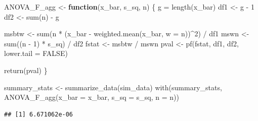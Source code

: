 \documentclass[
]{book}
\newenvironment{Shaded}{\begin{snugshade}}{\end{snugshade}}
\newcommand{\AttributeTok}[1]{\textcolor[rgb]{0.77,0.63,0.00}{#1}}
\newcommand{\ConstantTok}[1]{\textcolor[rgb]{0.00,0.00,0.00}{#1}}
\newcommand{\ControlFlowTok}[1]{\textcolor[rgb]{0.13,0.29,0.53}{\textbf{#1}}}
\newcommand{\DecValTok}[1]{\textcolor[rgb]{0.00,0.00,0.81}{#1}}
\newcommand{\FunctionTok}[1]{\textcolor[rgb]{0.00,0.00,0.00}{#1}}
\newcommand{\NormalTok}[1]{#1}
\newcommand{\OtherTok}[1]{\textcolor[rgb]{0.56,0.35,0.01}{#1}}
\newcommand{\SpecialCharTok}[1]{\textcolor[rgb]{0.00,0.00,0.00}{#1}}
\begin{document}
\begin{Shaded}
\begin{Highlighting}[]
\NormalTok{ANOVA\_F\_agg }\OtherTok{\textless{}{-}} \ControlFlowTok{function}\NormalTok{(x\_bar, s\_sq, n) \{}
\NormalTok{  g }\OtherTok{=} \FunctionTok{length}\NormalTok{(x\_bar)}
\NormalTok{  df1 }\OtherTok{\textless{}{-}}\NormalTok{ g }\SpecialCharTok{{-}} \DecValTok{1}
\NormalTok{  df2 }\OtherTok{\textless{}{-}} \FunctionTok{sum}\NormalTok{(n) }\SpecialCharTok{{-}}\NormalTok{ g}
  
\NormalTok{  msbtw }\OtherTok{\textless{}{-}} \FunctionTok{sum}\NormalTok{(n }\SpecialCharTok{*}\NormalTok{ (x\_bar }\SpecialCharTok{{-}} \FunctionTok{weighted.mean}\NormalTok{(x\_bar, }\AttributeTok{w =}\NormalTok{ n))}\SpecialCharTok{\^{}}\DecValTok{2}\NormalTok{) }\SpecialCharTok{/}\NormalTok{ df1}
\NormalTok{  mswn }\OtherTok{\textless{}{-}} \FunctionTok{sum}\NormalTok{((n }\SpecialCharTok{{-}} \DecValTok{1}\NormalTok{) }\SpecialCharTok{*}\NormalTok{ s\_sq) }\SpecialCharTok{/}\NormalTok{ df2}
\NormalTok{  fstat }\OtherTok{\textless{}{-}}\NormalTok{ msbtw }\SpecialCharTok{/}\NormalTok{ mswn}
\NormalTok{  pval }\OtherTok{\textless{}{-}} \FunctionTok{pf}\NormalTok{(fstat, df1, df2, }\AttributeTok{lower.tail =} \ConstantTok{FALSE}\NormalTok{)}
 
  \FunctionTok{return}\NormalTok{(pval)}
\NormalTok{\}}

\NormalTok{summary\_stats }\OtherTok{\textless{}{-}} \FunctionTok{summarize\_data}\NormalTok{(sim\_data)}
\FunctionTok{with}\NormalTok{(summary\_stats, }\FunctionTok{ANOVA\_F\_agg}\NormalTok{(}\AttributeTok{x\_bar =}\NormalTok{ x\_bar, }\AttributeTok{s\_sq =}\NormalTok{ s\_sq, }\AttributeTok{n =}\NormalTok{ n))}
\end{Highlighting}
\end{Shaded}

\begin{verbatim}
## [1] 6.671062e-06
\end{verbatim}
\end{document}
